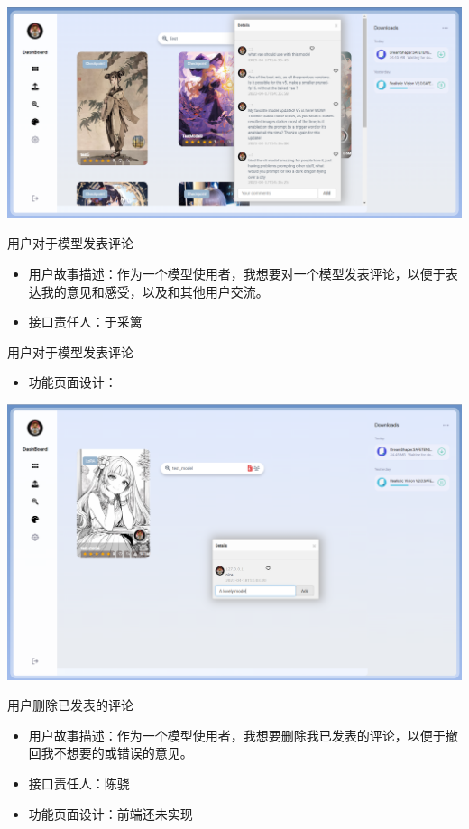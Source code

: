 \begin{frame}
    \includegraphics[width=1\textwidth]{contents/figure/comment_search.png}
\end{frame}

\begin{frame}{用户对于模型发表评论}
    \begin{itemize}
        \item 用户故事描述：作为一个模型使用者，我想要对一个模型发表评论，以便于表达我的意见和感受，以及和其他用户交流。
        \item 接口责任人：于采篱
    \end{itemize}
\end{frame}

\begin{frame}{用户对于模型发表评论}
    \begin{itemize}
        \item 功能页面设计：
    \end{itemize}
    \includegraphics[width=1\textwidth]{contents/figure/user_stories_demo_add_comment.png}
\end{frame}

\begin{frame}{用户删除已发表的评论}
    \begin{itemize}
        \item 用户故事描述：作为一个模型使用者，我想要删除我已发表的评论，以便于撤回我不想要的或错误的意见。
        \item 接口责任人：陈骁
        \item 功能页面设计：前端还未实现
    \end{itemize}
\end{frame}

